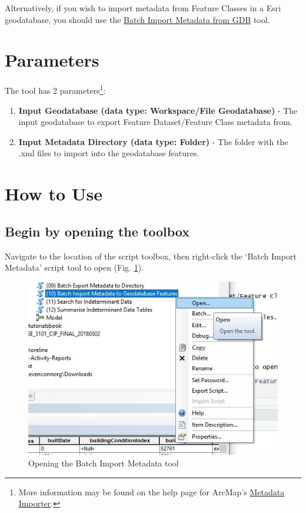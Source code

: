 \documentclass[openany]{book}
\providecommand{\tightlist}{%
  \setlength{\itemsep}{0pt}\setlength{\parskip}{0pt}}
\let\rmarkdownfootnote\footnote%
\def\footnote{\protect\rmarkdownfootnote}
\theoremstyle{definition}
\theoremstyle{definition}
\theoremstyle{definition}
\theoremstyle{remark}
\begin{document}
Alternatively, if you wish to import metadata from Feature Classes in a
Esri geodatabase, you should use the \protect\hyperlink{imMetaGDB}{Batch
Import Metadata from GDB} tool.

\section{Parameters}\label{parameters-11}

The tool has 2 parameters\footnote{More information may be found on the
  help page for ArcMap's
  \href{http://desktop.arcgis.com/en/arcmap/latest/tools/conversion-toolbox/metadata-importer.htm}{Metadata
  Importer}.}:

\begin{enumerate}
\def\labelenumi{\arabic{enumi}.}
\tightlist
\item
  \textbf{Input Geodatabase (data type: Workspace/File Geodatabase)} -
  The input geodatabase to export Feature Dataset/Feature Class metadata
  from.
\item
  \textbf{Input Metadata Directory (data type: Folder)} - The folder
  with the .xml files to import into the geodatabase features.
\end{enumerate}

\section{How to Use}\label{how-to-use-11}

\subsection{Begin by opening the
toolbox}\label{begin-by-opening-the-toolbox-11}

Navigate to the location of the script toolbox, then right-click the
`Batch Import Metadata' script tool to open (Fig. \ref{fig:imMetaopen}).

\begin{figure}[H]

{\centering \includegraphics{figures/imMeta-open} 

}

\caption{Opening the Batch Import Metadata tool}\label{fig:imMetaopen}
\end{figure}
\end{document}
